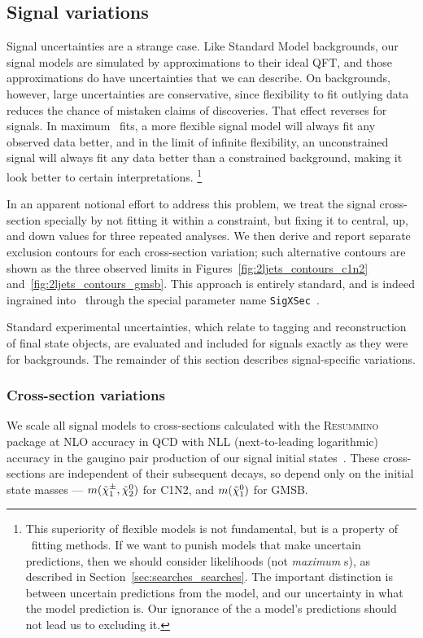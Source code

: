 \subsection{Signal variations}
\label{sec:2ljets_signal_variations}
Signal uncertainties are a strange case.
Like Standard Model backgrounds, our signal models are simulated by
approximations to their ideal QFT, and those approximations do have
uncertainties that we can describe.
On backgrounds, however, large uncertainties are conservative, since
flexibility to fit outlying data reduces the chance of mistaken claims of
discoveries.
That effect reverses for signals.
In maximum \heplikelihood\ fits, a more flexible
signal model will always fit any observed data better, and in the limit of
infinite flexibility, an unconstrained signal will always fit
any data better than a constrained background, making it look better to certain
interpretations.%
\footnote{%
This superiority of flexible models is not fundamental, but is a property of
\heplikelihood\ fitting methods.
If we want to punish models that make uncertain predictions, then we should
consider likelihoods (not \emph{maximum} \heplikelihood s), as described in
Section~\ref{sec:searches_searches}.
The important distinction is between uncertain predictions from the model,
and our uncertainty in what the model prediction is.
Our ignorance of the a model's predictions should not lead us to excluding it.
}

In an apparent notional effort to address this problem, we treat the signal
cross-section specially by not fitting it within a constraint, but fixing it
to central, up, and down values for three repeated analyses.
We then derive and report separate exclusion contours for each cross-section
variation;
such alternative contours are shown as the three observed limits
in Figures~\ref{fig:2ljets_contours_c1n2} and~\ref{fig:2ljets_contours_gmsb}.
This approach is entirely standard, and is indeed ingrained into \histfitter\
through the special parameter name
\texttt{SigXSec}~\cite{histfitter2014, histfittergithub}.

Standard experimental uncertainties, which relate to tagging and
reconstruction of final state objects, are evaluated and included for signals
exactly as they were for backgrounds.
The remainder of this section describes signal-specific variations.

\subsubsection{Cross-section variations}
\label{sec:2ljets_xsec_variations}
We scale all signal models to cross-sections calculated with the
\textsc{Resummino} package at NLO accuracy in QCD with NLL
(next-to-leading logarithmic) accuracy in the gaugino pair production of our
signal initial states~\cite{Fuks:2012qx, Fuks:2013vua}.
These cross-sections are independent of their subsequent decays, so depend only
on the initial state masses ---
$m(\tilde\chi^\pm_1, \tilde\chi^0_2)$ for C1N2, and
$m(\tilde\chi^0_1)$ for GMSB.


